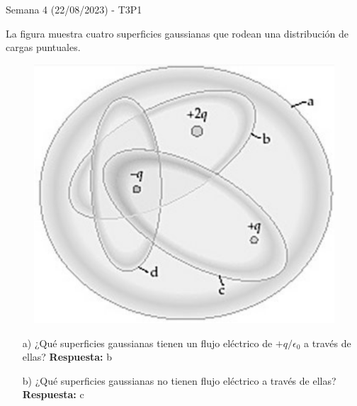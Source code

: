 \begin{frame}{Semana 4 (22/08/2023) - T3P1}
    
    La figura muestra cuatro superficies gaussianas que rodean una distribución de cargas puntuales.
    
    \begin{figure}
        \centering
        \includegraphics[scale=0.25]{figures/t3p1.png}
    \end{figure}
    
    \begin{itemize}
        \item[a)] ¿Qué superficies gaussianas tienen un flujo eléctrico de $+q/\epsilon_0$ a través de ellas? 
        \pause \textbf{Respuesta:} b
        \pause \item[b)] ¿Qué superficies gaussianas no tienen flujo eléctrico a través de ellas? 
        \pause \textbf{Respuesta:} c
    \end{itemize}
    
\end{frame}

